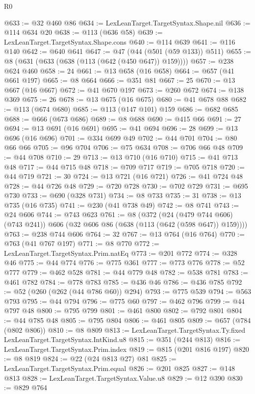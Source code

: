 \begin{lexlean}{R0}
\begin{coremodule}
{{{{{{{{{{{{{{{{{{{{{{{{{{{{{{{{{{{{{{{{{{{{{{{{{{{{{{{{{{{{{{{{{{{{{{{{{@633 := @32 @460 @86
@634 := LexLeanTarget.TargetSyntax.Shape.nil
@636 := @114 @634 @20
@638 := @113 (@636 @58)
@639 := LexLeanTarget.TargetSyntax.Shape.cons
@640 := @114 @639
@641 := @116 @140
@642 := @640 @641
@647 := @47 (@44 (@501 (@59 @133)) @511)
@655 := @8 (@631 (@633 (@638 (@113 (@642 (@450 @647)) @159))))
@657 := @238 @624 @460
@658 := 24
@661 := @13 @658 (@16 @658)
@664 := @657 (@41 @661 @197)
@665 := @8 @664
@666 := @351 @81
@667 := 25
@670 := @13 @667 (@16 @667)
@672 := @41 @670 @197
@673 := @260 @672
@674 := @138 @369
@675 := 26
@678 := @13 @675 (@16 @675)
@680 := @41 @678 @88
@682 := @113 (@674 @680)
@685 := @113 (@147 @101) @159
@686 := @682 @685
@688 := @666 (@673 @686)
@689 := @8 @688
@690 := @415 @66
@691 := 27
@694 := @13 @691 (@16 @691)
@695 := @41 @694
@696 := 28
@699 := @13 @696 (@16 @696)
@701 := @334 @699 @49
@702 := @44 @701
@704 := @80 @66 @66
@705 := @96 @704
@706 := @75 @634
@708 := @706 @66 @48
@709 := @44 @708
@710 := 29
@713 := @13 @710 (@16 @710)
@715 := @41 @713 @48
@717 := @44 @715 @48
@718 := @709 @717
@719 := @705 @718
@720 := @44 @719
@721 := 30
@724 := @13 @721 (@16 @721)
@726 := @41 @724 @48
@728 := @44 @726 @48
@729 := @720 @728
@730 := @702 @729
@731 := @695 @730
@733 := @690 (@328 @731)
@734 := @8 @733
@735 := 31
@738 := @13 @735 (@16 @735)
@741 := @230 (@41 @738 @49)
@742 := @8 @741
@743 := @24 @606
@744 := @743 @623
@761 := @8
    (@372
      (@24 (@479 @744 @606) (@743 @241))
      @606
      (@32 @606 @86 (@638 (@113 (@642 (@598 @647)) @159))))
@763 := @238 @744 @606
@764 := 32
@767 := @13 @764 (@16 @764)
@770 := @763 (@41 @767 @197)
@771 := @8 @770
@772 := LexLeanTarget.TargetSyntax.Prim.natEq
@773 := @201 @772
@774 := @328 @46
@775 := @44 @774
@776 := @775 @361
@777 := @773 @776
@778 := @52 @777
@779 := @462 @528
@781 := @44 @779 @48
@782 := @538 @781
@783 := @461 @782
@784 := @778 @783
@785 := @436 @46
@786 := @436 @785
@792 := @52 (@260 (@262 (@44 @786 @60)) @294)
@793 := @775 @539
@794 := @563 @793
@795 := @44 @794
@796 := @775 @60
@797 := @462 @796
@799 := @44 @797 @48
@800 := @795 @799
@801 := @461 @800
@802 := @792 @801
@804 := @44 @785 @48
@805 := @795 @804
@806 := @461 @805
@809 := @657 (@784 (@802 @806))
@810 := @8 @809
@813 := LexLeanTarget.TargetSyntax.Ty.fixed LexLeanTarget.TargetSyntax.IntKind.u8
@815 := @351 (@244 @813)
@816 := LexLeanTarget.TargetSyntax.Prim.index
@819 := @815 (@201 @816 @197)
@820 := @8 @819
@824 := @22 (@24 @813 @27) @81
@825 := LexLeanTarget.TargetSyntax.Prim.equal
@826 := @201 @825
@827 := @148 @813
@828 := LexLeanTarget.TargetSyntax.Value.u8
@829 := @12 @390
@830 := @829 @764
}}}}}}}}}}}}}}}}}}}}}}}}}}}}}}}}}}}}}}}}}}}}}}}}}}}}}}}}}}}}}}}}}}}}}}}}}
\end{coremodule}
\end{lexlean}
